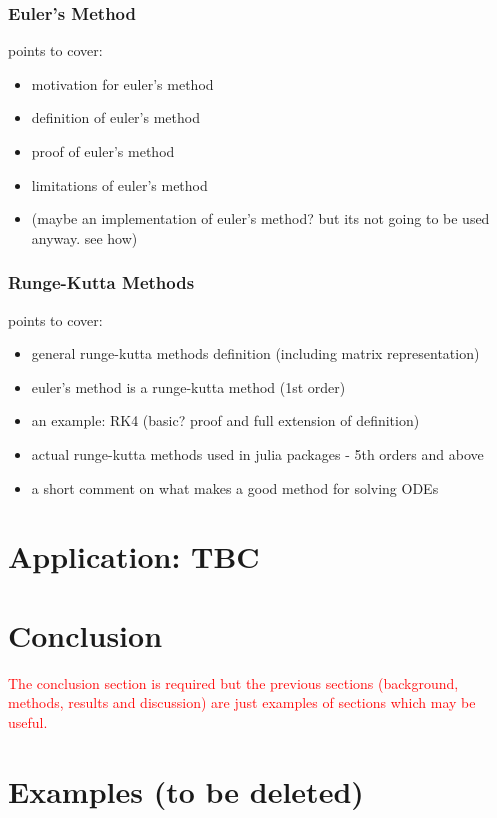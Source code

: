 \documentclass[a4paper,11pt, titlepage]{article}
\theoremstyle{definition}
\theoremstyle{plain}
\theoremstyle{remark}
\begin{document}
\subsubsection{Euler's Method}
points to cover:
\begin{itemize}
    \item motivation for euler's method
    \item definition of euler's method
    \item proof of euler's method
    \item limitations of euler's method
    \item (maybe an implementation of euler's method? but its not going to be used anyway. see how)
\end{itemize}

\subsubsection{Runge-Kutta Methods}
points to cover:
\begin{itemize}
    \item general runge-kutta methods definition (including matrix representation)
    \item euler's method is a runge-kutta method (1st order)
    \item an example: RK4 (basic? proof and full extension of definition)
    \item actual runge-kutta methods used in julia packages - 5th orders and above  
    \item a short comment on what makes a good method for solving ODEs
\end{itemize}

\section{Application: TBC}

\section{Conclusion}
\textcolor{red}{The conclusion section is required but the previous sections (background, methods, results and discussion) are just examples of sections which may be useful.}


\section{Examples (to be deleted)}
\end{document}
